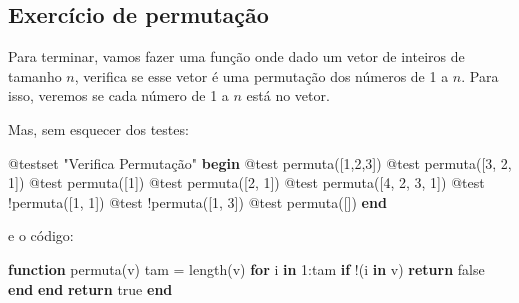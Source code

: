 \documentclass[
  letterpaper,
  DIV=11,
  numbers=noendperiod]{scrreprt}
\newenvironment{Shaded}{\begin{snugshade}}{\end{snugshade}}
\newcommand{\ConstantTok}[1]{\textcolor[rgb]{0.56,0.35,0.01}{#1}}
\newcommand{\ControlFlowTok}[1]{\textcolor[rgb]{0.00,0.23,0.31}{\textbf{#1}}}
\newcommand{\FloatTok}[1]{\textcolor[rgb]{0.68,0.00,0.00}{#1}}
\newcommand{\FunctionTok}[1]{\textcolor[rgb]{0.28,0.35,0.67}{#1}}
\newcommand{\KeywordTok}[1]{\textcolor[rgb]{0.00,0.23,0.31}{\textbf{#1}}}
\newcommand{\NormalTok}[1]{\textcolor[rgb]{0.00,0.23,0.31}{#1}}
\newcommand{\OperatorTok}[1]{\textcolor[rgb]{0.37,0.37,0.37}{#1}}
\newcommand{\PreprocessorTok}[1]{\textcolor[rgb]{0.68,0.00,0.00}{#1}}
\newcommand{\StringTok}[1]{\textcolor[rgb]{0.13,0.47,0.30}{#1}}
\begin{document}
\subsection{Exercício de
permutação}\label{exercuxedcio-de-permutauxe7uxe3o}

Para terminar, vamos fazer uma função onde dado um vetor de inteiros de
tamanho \(n\), verifica se esse vetor é uma permutação dos números de 1
a \(n\). Para isso, veremos se cada número de 1 a \(n\) está no vetor.

Mas, sem esquecer dos testes:

\begin{Shaded}
\begin{Highlighting}[]
\PreprocessorTok{@testset} \StringTok{"Verifica Permutação"} \ControlFlowTok{begin}
    \PreprocessorTok{@test} \FunctionTok{permuta}\NormalTok{([}\FloatTok{1}\NormalTok{,}\FloatTok{2}\NormalTok{,}\FloatTok{3}\NormalTok{])}
    \PreprocessorTok{@test} \FunctionTok{permuta}\NormalTok{([}\FloatTok{3}\NormalTok{, }\FloatTok{2}\NormalTok{, }\FloatTok{1}\NormalTok{])}
    \PreprocessorTok{@test} \FunctionTok{permuta}\NormalTok{([}\FloatTok{1}\NormalTok{])}
    \PreprocessorTok{@test} \FunctionTok{permuta}\NormalTok{([}\FloatTok{2}\NormalTok{, }\FloatTok{1}\NormalTok{])}
    \PreprocessorTok{@test} \FunctionTok{permuta}\NormalTok{([}\FloatTok{4}\NormalTok{, }\FloatTok{2}\NormalTok{, }\FloatTok{3}\NormalTok{, }\FloatTok{1}\NormalTok{])}
    \PreprocessorTok{@test}\NormalTok{ !}\FunctionTok{permuta}\NormalTok{([}\FloatTok{1}\NormalTok{, }\FloatTok{1}\NormalTok{])}
    \PreprocessorTok{@test}\NormalTok{ !}\FunctionTok{permuta}\NormalTok{([}\FloatTok{1}\NormalTok{, }\FloatTok{3}\NormalTok{])}
    \PreprocessorTok{@test} \FunctionTok{permuta}\NormalTok{([])}
\ControlFlowTok{end}
\end{Highlighting}
\end{Shaded}

e o código:

\begin{Shaded}
\begin{Highlighting}[]
\KeywordTok{function} \FunctionTok{permuta}\NormalTok{(v)}
\NormalTok{   tam }\OperatorTok{=} \FunctionTok{length}\NormalTok{(v)}
   \ControlFlowTok{for}\NormalTok{ i }\KeywordTok{in} \FloatTok{1}\OperatorTok{:}\NormalTok{tam}
      \ControlFlowTok{if}\NormalTok{  !(i }\KeywordTok{in}\NormalTok{ v)}
         \ControlFlowTok{return} \ConstantTok{false}
      \ControlFlowTok{end}
   \ControlFlowTok{end}
   \ControlFlowTok{return} \ConstantTok{true}
\KeywordTok{end}
\end{Highlighting}
\end{Shaded}
\end{document}
